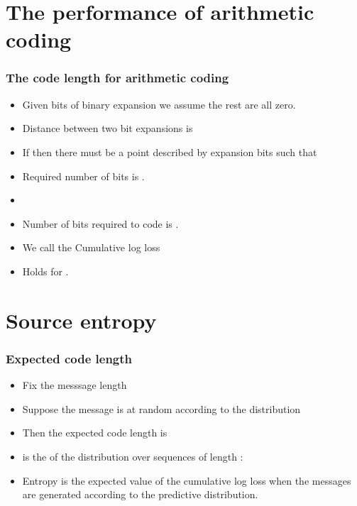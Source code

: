 \documentclass[handout]{beamer}
\begin{document}

\section{The performance of arithmetic coding}

\begin{frame}
\frametitle{The code length for arithmetic coding}
\begin{itemize}
\item Given  bits of binary expansion we assume the rest are all zero.
\item Distance between two  bit expansions is 
\item If  then there must be a point  described by  expansion bits such that 
\item Required number of bits is .
\item {}
\item Number of bits required to code  is
.
\item We call  the {\color{blue} Cumulative log loss}
\item Holds for .
\end{itemize}
\end{frame}

\section{Source entropy}

\begin{frame}
\frametitle{Expected code length}
\begin{itemize}
\item Fix the messsage length 
\item Suppose the message is  at random according to the distribution 
\item Then the expected code length is 
\item {} is the  of the distribution over
  sequences of length :
\item Entropy is the expected value of the cumulative log loss when the messages are generated according to the predictive distribution.
\end{itemize}
\end{frame}
\end{document}
